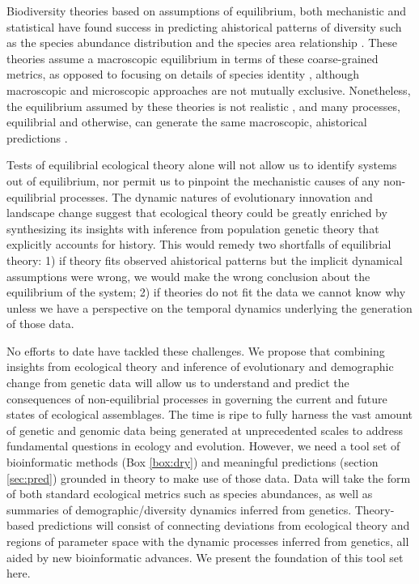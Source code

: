 \documentclass[12pt]{article}
\newcounter{Box}
\begin{document}
Biodiversity theories based on assumptions of
equilibrium, both mechanistic \citep{Hubbell2001-dx, Chesson2000-uc,
  Tilman2004-xt} and statistical \citep[see the
Glossary;][]{Harte2011-um, Pueyo2007-iq} have found success in
predicting ahistorical patterns of diversity such as the species
abundance distribution \citep{White2012-yw, Hubbell2001-dx,
  Harte2011-um} and the species area relationship
\citep{Hubbell2001-dx, Harte2011-um}. These theories assume a
macroscopic equilibrium in terms of these coarse-grained metrics, as opposed to
focusing on details of species identity \citep[such as
in][]{blonder2015}, although macroscopic and microscopic approaches are not mutually
exclusive.  Nonetheless, the equilibrium assumed by these
theories is not realistic \citep{Ricklefs2006-tn}, and many
processes, equilibrial and otherwise, can generate the same
macroscopic, ahistorical predictions \citep{McGill2007-hx}.

Tests of equilibrial ecological theory alone will not allow us to
identify systems out of equilibrium, nor permit us to pinpoint the
mechanistic causes of any non-equilibrial
processes. The dynamic natures of evolutionary innovation and
landscape change suggest that ecological theory could be greatly
enriched by synthesizing its insights with inference from population
genetic theory that explicitly accounts for history. This would remedy two shortfalls of equilibrial theory:
1) if theory fits observed ahistorical patterns but the implicit
dynamical assumptions were wrong, we would make the wrong conclusion
about the equilibrium of the system; 2) if theories do
not fit the data we cannot know why unless we have a perspective on
the temporal dynamics underlying the generation of those data.

No efforts to date have tackled these challenges. We propose that combining insights from ecological theory and
inference of evolutionary and demographic change from genetic data
will allow us to understand and predict the consequences of
non-equilibrial processes in governing the current and future states
of ecological assemblages. The time is ripe to fully harness the vast amount of
genetic and genomic data being generated at unprecedented scales
\citep{Yu2012, pompanon2012, taberlet2012, ji2013, zhou2013, tang2014,
  bohmann2014, gibson2014, shokralla2015, linard2015, leray2015,
  dodsworth2015, liu2016} to address fundamental questions in ecology
and evolution. However, we need a tool set of bioinformatic methods (Box
\ref{box:dry}) and meaningful predictions (section \ref{sec:pred})
grounded in theory to make use of those data. Data will take the form
of both standard ecological metrics such as species abundances, as
well as summaries of demographic/diversity dynamics inferred from
genetics. Theory-based predictions will consist of connecting
deviations from ecological theory and regions of parameter space with
the dynamic processes inferred from genetics, all aided by new
bioinformatic advances. We present the foundation of this tool set here.
\end{document}
